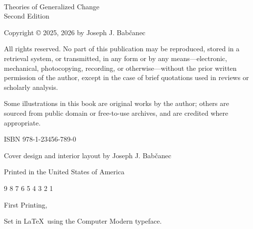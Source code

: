 \documentclass[12pt, oneside]{book}
\begin{document}
\newpage
\thispagestyle{empty}
\
\clearpage

\newpage
\thispagestyle{empty}
\vspace*{2cm}

\noindent Theories of Generalized Change \\
Second Edition

\vspace{1.2cm}

\noindent Copyright © 2025, 2026 by Joseph J. Babčanec

\noindent All rights reserved. No part of this publication may be reproduced, stored in a retrieval system, or transmitted, in any form or by any means—electronic, mechanical, photocopying, recording, or otherwise—without the prior written permission of the author, except in the case of brief quotations used in reviews or scholarly analysis.

\vspace{1.2cm}

\noindent Some illustrations in this book are original works by the author; others are sourced from public domain or free-to-use archives, and are credited where appropriate.

\vspace{1.2cm}

\noindent ISBN 978-1-23456-789-0

\vspace{1.2cm}

\noindent Cover design and interior layout by Joseph J. Babčanec

\vspace{1.2cm}

\noindent Printed in the United States of America

\vspace{1.2cm}

 9 8 7 6 5 4 3 2 1

\noindent First Printing, \the\year

\vfill

\noindent Set in \LaTeX\ using the Computer Modern typeface.
\newpage

\fancypagestyle{intro}{
    \fancyhf{} %
    \fancyhead[R]{\textit{\MakeUppercase{Introduction}}} %
    \fancyfoot[C]{\thepage} %
}
\pagestyle{intro}
\end{document}
